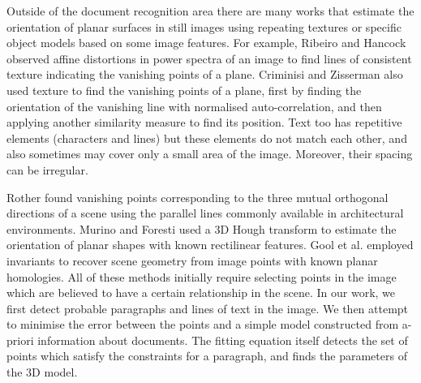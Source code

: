\documentclass{elsart}   %
\begin{document}
Outside of the document recognition area there are  many works that
estimate the orientation of planar surfaces in still images 
using  repeating textures or specific object models based on some image features.
For example, Ribeiro and Hancock \cite{ribeiro}
observed affine distortions in power spectra of an image to find lines of
consistent texture indicating the vanishing points of a plane. Criminisi and
Zisserman \cite{zisserman} also used texture to find the vanishing points of a
plane,  first by finding the orientation of the vanishing line with normalised
auto-correlation, and then applying another similarity measure to find its position.
Text too has repetitive elements (characters and lines) but
these elements do not match each other, and also sometimes may cover only a
small area of the image. Moreover, their spacing can be irregular.



Rother \cite{rother0} found vanishing points corresponding to the three mutual
orthogonal directions of a scene using the parallel lines commonly available
in architectural environments.  Murino and Foresti \cite{MURIN} used a 3D Hough
transform to estimate the orientation of planar shapes with known rectilinear
features.  Gool et al. \cite{vangool98planar}  employed invariants to
recover scene geometry from image points with known planar homologies.  All of
these methods initially require selecting points in the image which are believed
to have a certain relationship in the scene.  In our work, we first detect
probable paragraphs and lines of text in the image.  We then attempt to minimise
the error between the points and a simple model constructed from a-priori information
about documents.  The fitting equation itself detects the set of points which
satisfy the constraints for a paragraph, and finds the parameters of the 3D
model.
\end{document}

